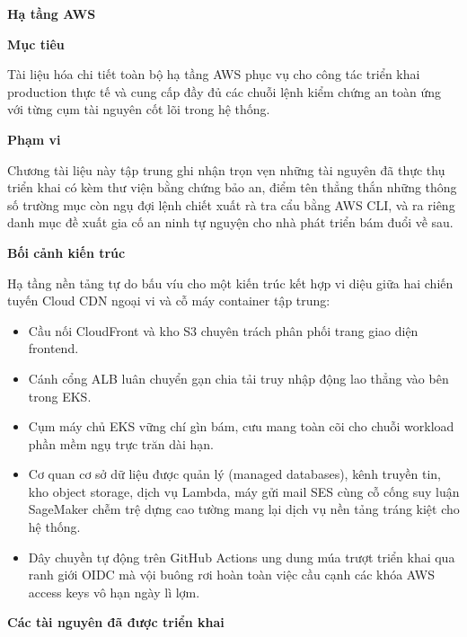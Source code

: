 \vspace{0.5em}\noindent\textbf{Hạ tầng AWS}\par

\vspace{0.5em}\noindent\textbf{Mục tiêu}\par

Tài liệu hóa chi tiết toàn bộ hạ tầng AWS phục vụ cho công tác triển
khai production thực tế và cung cấp đầy đủ các chuỗi lệnh kiểm chứng an
toàn ứng với từng cụm tài nguyên cốt lõi trong hệ thống.

\vspace{0.5em}\noindent\textbf{Phạm vi}\par

Chương tài liệu này tập trung ghi nhận trọn vẹn những tài nguyên đã thực
thụ triển khai có kèm thư viện bằng chứng bảo an, điểm tên thẳng thắn
những thông số trường mục còn ngụ đợi lệnh chiết xuất rà tra cẩu bằng
AWS CLI, và ra riêng danh mục đề xuất gia cố an ninh tự nguyện cho nhà
phát triển bám đuổi về sau.

\vspace{0.5em}\noindent\textbf{Bối cảnh kiến
trúc}\par

Hạ tầng nền tảng tự do bấu víu cho một kiến trúc kết hợp vi diệu giữa
hai chiến tuyến Cloud CDN ngoại vi và cỗ máy container tập trung:

\begin{itemize}
\tightlist
\item
  Cầu nối CloudFront và kho S3 chuyên trách phân phối trang giao diện
  frontend.
\item
  Cánh cổng ALB luân chuyển gạn chia tải truy nhập động lao thẳng vào
  bên trong EKS.
\item
  Cụm máy chủ EKS vững chí gìn bám, cưu mang toàn cõi cho chuỗi workload
  phần mềm ngụ trực trăn dài hạn.
\item
  Cơ quan cơ sở dữ liệu được quản lý (managed databases), kênh truyền
  tin, kho object storage, dịch vụ Lambda, máy gửi mail SES cùng cỗ cống
  suy luận SageMaker chễm trệ dựng cao tường mang lại dịch vụ nền tảng
  tráng kiệt cho hệ thống.
\item
  Dây chuyền tự động trên GitHub Actions ung dung múa trượt triển khai
  qua ranh giới OIDC mà vội buông rơi hoàn toàn việc cầu cạnh các khóa
  AWS access keys vô hạn ngày lì lợm.
\end{itemize}

\vspace{0.5em}\noindent\textbf{Các tài nguyên đã được triển
khai}\par

